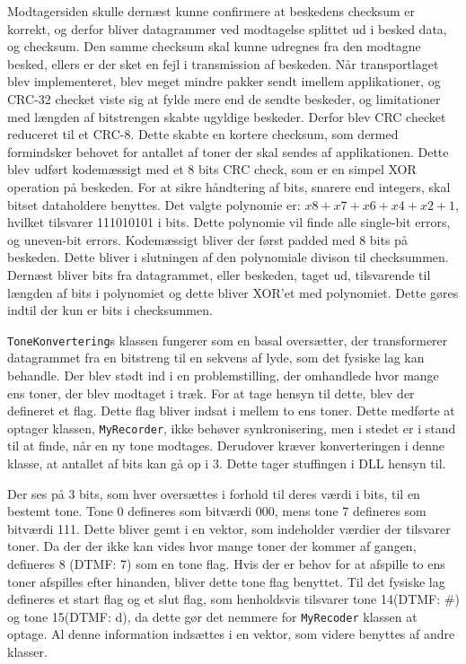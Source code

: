 Modtagersiden skulle dernæst kunne confirmere at beskedens checksum er korrekt, og derfor bliver datagrammer ved modtagelse splittet ud i besked data, og checksum. Den samme checksum skal kunne udregnes fra den modtagne besked, ellers er der sket en fejl i transmission af beskeden.
\newline
Når transportlaget blev implementeret, blev meget mindre pakker sendt imellem applikationer, og CRC-32 checket viste sig at fylde mere end de sendte beskeder, og limitationer med længden af bitstrengen skabte ugyldige beskeder. Derfor blev CRC checket reduceret til et CRC-8. Dette skabte en kortere checksum, som dermed formindsker behovet for antallet af toner der skal sendes af applikationen.
\newline
Dette blev udført kodemæssigt med et 8 bits CRC check, som er en simpel XOR operation på beskeden. For at sikre håndtering af bits, snarere end integers, skal bitset dataholdere benyttes.
\newline
Det valgte polynomie er: $x8 + x7 + x6 + x4 + x2 + 1$, hvilket tilsvarer 111010101 i bits. Dette polynomie vil finde alle single-bit errors, og uneven-bit errors.
Kodemæssigt bliver der først padded med 8 bits på beskeden. Dette bliver i slutningen af den polynomiale divison til checksummen. Dernæst bliver bits fra datagrammet, eller beskeden, taget ud, tilsvarende til længden af bits i polynomiet og dette bliver XOR’et med polynomiet. Dette gøres indtil der kun er bits i checksummen.
\hfill \break

\texttt{ToneKonvertering}s klassen fungerer som en basal oversætter, der transformerer datagrammet fra en bitstreng til en sekvens af lyde, som det fysiske lag kan behandle.
\newline
Der blev stødt ind i en problemstilling, der omhandlede hvor mange ens toner, der blev modtaget i træk. For at tage hensyn til dette, blev der defineret et flag. Dette flag bliver indsat i mellem to ens toner. Dette medførte at optager klassen, \texttt{MyRecorder}, ikke behøver synkronisering, men i stedet er i stand til at finde, når en ny tone modtages. Derudover kræver konverteringen i denne klasse, at antallet af bits kan gå op i 3. Dette tager stuffingen i DLL hensyn til.
\hfill \break

Der ses på 3 bits, som hver oversættes i forhold til deres værdi i bits, til en bestemt tone.
\newline
Tone 0 defineres som bitværdi 000, mens tone 7 defineres som bitværdi 111. Dette bliver gemt i en vektor, som indeholder værdier der tilsvarer toner.
\newline
Da der der ikke kan vides hvor mange toner der kommer af gangen, defineres 8 (DTMF: 7) som en tone flag. Hvis der er behov for at afspille to ens toner afspilles efter hinanden, bliver dette tone flag benyttet.
\newline
Til det fysiske lag defineres et start flag og et slut flag, som henholdsvis tilsvarer tone 14(DTMF: \#) og tone 15(DTMF: d), da dette gør det nemmere for \texttt{MyRecoder} klassen at optage.
\newline
 Al denne information indsættes i en vektor, som videre benyttes af andre klasser.